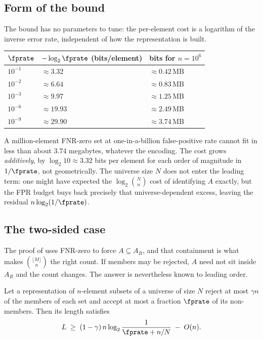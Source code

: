 \subsection*{Form of the bound}

The bound has no parameters to tune: the per-element cost is a logarithm of the
inverse error rate, independent of how the representation is
built.
\begin{center}
\begin{tabular}{l|ll}
\hline
  $\fprate$ & $-\log_2 \fprate$ (bits/element) & bits for $n = 10^6$ \\
\hline
  $10^{-1}$ & $\approx 3.32$  & $\approx 0.42$\,MB \\
  $10^{-2}$ & $\approx 6.64$  & $\approx 0.83$\,MB \\
  $10^{-3}$ & $\approx 9.97$  & $\approx 1.25$\,MB \\
  $10^{-6}$ & $\approx 19.93$ & $\approx 2.49$\,MB \\
  $10^{-9}$ & $\approx 29.90$ & $\approx 3.74$\,MB \\
\hline
\end{tabular}
\end{center}
A million-element FNR-zero set at one-in-a-billion false-positive rate cannot
fit in less than about $3.74$ megabytes, whatever the encoding. The cost grows
\emph{additively}, by $\log_2 10 \approx 3.32$ bits per element for each order
of magnitude in $1/\fprate$, not geometrically. The universe size $N$ does not
enter the leading term: one might have expected the $\log_2\binom{N}{n}$ cost
of identifying $A$ exactly, but the FPR budget buys back precisely that
universe-dependent excess, leaving the residual $n\log_2(1/\fprate)$.

\subsection*{The two-sided case}

The proof of  uses FNR-zero to force $A \subseteq
A_R$, and that containment is what makes $\binom{\lfloor M \rfloor}{n}$ the
right count. If members may be rejected, $A$ need not
sit inside $A_R$ and the count changes. The answer is nevertheless known to leading order.

\begin{proposition}
\label{prop:two-sided-floor}
Let a representation of $n$-element subsets of a universe of size $N$ reject
at most $\gamma n$ of the members of each set and accept at most a fraction
$\fprate$ of its non-members. Then its length satisfies
\[
  L \;\ge\; (1 - \gamma)\, n \log_2 \frac{1}{\fprate + n/N} \;-\; O(n).
\]
\end{proposition}


